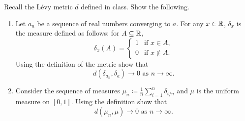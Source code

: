 \documentclass[12pt]{article}
\begin{document}
\begin{problem*}
    Recall the L\'evy metric $d$ defined in class.
    Show the following.
    \begin{enumerate}
        \item Let $a_n$ be a sequence of real numbers converging to $a$.
        For any $x \in \mathbb{R}$, $\delta_x$ is the measure defined as follows:
        for $A \subseteq \mathbb{R}$, \[
            \delta_x(A) = \begin{cases}
                1 & \text{if } x \in A, \\
                0 & \text{if } x \notin A.
            \end{cases}
        \] Using the definition of the metric show that \[
            d(\delta_{a_n}, \delta_a) \to 0 \text{ as } n \to \infty.
        \]
        \item Consider the sequence of measures
        $\mu_n \coloneq \frac1n \sum_{i=1}^n \delta_{i/n}$
        and $\mu$ is the uniform measure on $[0, 1]$.
        Using the definition show that
        \[
            d(\mu_n, \mu) \to 0 \text{ as } n \to \infty.
        \]
    \end{enumerate}
\end{problem*}
\end{document}
